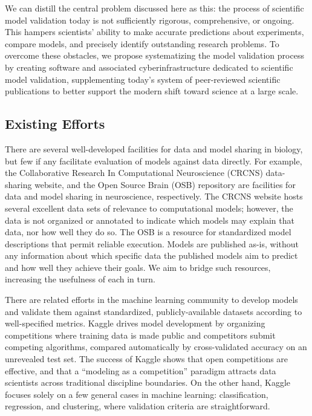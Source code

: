\documentclass[11pt,letterpaper]{article}
\begin{document}
We can distill the central problem discussed here as this: the process of scientific model validation today is not sufficiently rigorous, comprehensive, or ongoing. This hampers scientists' ability to make accurate predictions about experiments, compare models, and precisely identify outstanding research problems. To overcome these obstacles, we propose systematizing the model validation process by creating software and associated cyberinfrastructure dedicated to scientific model validation, supplementing today's system of peer-reviewed scientific publications to better support the modern shift toward science at a large scale.

\subsection{Existing Efforts}\label{sec:existing_efforts}
There are several well-developed facilities for data and model sharing in biology, but few if any facilitate evaluation of models against data directly.  For example, the Collaborative Research In Computational Neuroscience (CRCNS) data-sharing website\cite{crcns_url}, and the Open Source Brain (OSB) repository\cite{osb_url} are facilities for data and model sharing in neuroscience, respectively.  The CRCNS website hosts several excellent data sets of relevance to computational models; however, the data is not organized or annotated to indicate which models may explain that data, nor how well they do so.  The OSB is a resource for standardized model descriptions that permit reliable execution. Models are published as-is, without any information about which specific data the published models aim to predict and how well they achieve their goals. We aim to bridge such resources, increasing the usefulness of each in turn.

There are related efforts in the machine learning community to develop models and validate them against standardized, publicly-available datasets according to well-specified metrics. Kaggle\cite{kaggle_url} drives model development by organizing competitions where training data is made public and competitors submit competing algorithms, compared automatically by cross-validated accuracy on an unrevealed test set. The success of Kaggle shows that open competitions are effective\cite{carpenter_may_2011}, and that a ``modeling as a competition'' paradigm attracts data scientists across traditional discipline boundaries.  On the other hand, Kaggle focuses solely on a few general cases in machine learning: classification, regression, and clustering, where validation criteria are straightforward.
\end{document}
